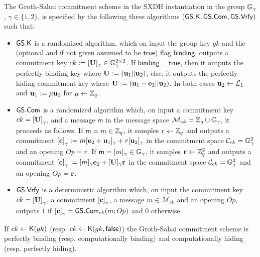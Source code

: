 \begin{definition} The Groth-Sahai commitment scheme in the SXDH instantiation in the group $\mathbb{G}_\gamma$, $\gamma\in\{1,2\}$, is  specified by the following three algorithms 
	$(\mathsf{GS}.\mathsf{K},\mathsf{GS}.\mathsf{Com},\mathsf{GS}.\mathsf{Vrfy})$ such that:
	\begin{itemize} 
		\item  $\mathsf{GS}.\mathsf{K}$ is a randomized algorithm, which on input the group key $gk$ and the (optional and if not given assumed to be $\mathsf{true}$) flag $\mathsf{binding}$, outputs a commitment key $ck:=[\mathbf{{U}}]_\gamma\in\mathbb{G}_\gamma^{2\times 2}$. If $\mathsf{binding}=\mathsf{true}$, then it outputs the {perfectly binding key} where $\mathbf{{U}}:=(\mathbf{u}_1||\mathbf{u}_2)$, else, it outputs the {perfectly hiding commitment key} where $\mathbf{{U}}:=(\mathbf{u}_1-\mathbf{e}_2||\mathbf{u}_2)$. In both cases $\mathbf{u}_2\gets\mathcal{L}_{1}$ and $\mathbf{u}_1:=\mu\mathbf{u}_2$ for $\mu\gets\mathbb{Z}_q$.
		\item $\mathsf{GS}.\mathsf{Com}$ is a randomized algorithm which, on input a commitment key $ck=\left[\mathbf{{U}}\right]_\gamma$, and a message 
		$\mathsf{m}$ in the message space $\mathcal{M}_{ck}=\mathbb{Z}_q\cup\mathbb{G}_\gamma$, it proceeds as follows. If $\mathsf{m}=m\in\mathbb{Z}_q$, it samples $r \gets \mathbb{Z}_q$ and outputs a commitment $\left[\mathbf{c}\right]_\gamma := m[\mathbf{e}_2+\mathbf{u}_1]_\gamma+r[\mathbf{u}_2]_\gamma$ in the commitment space $\mathcal{C}_{ck}=\mathbb{G}_\gamma^2$ and an opening $Op=r$. If $\mathsf{m}=[m]_\gamma\in\mathbb{G}_\gamma$, it samples $\mathbf{r} \gets \mathbb{Z}_q^2$ and outputs a commitment $\left[\mathbf{c}\right]_\gamma := [m]_\gamma\mathbf{e}_2+[\mathbf{{U}}]_\gamma\mathbf{r}$ in the commitment space $\mathcal{C}_{ck}=\mathbb{G}_\gamma^2$ and an opening $Op=\mathbf{r}$.
		\item $\mathsf{GS}.\mathsf{Vrfy}$ is a deterministic algorithm which, on input the commitment key $ck=\left[\mathbf{{U}}\right]_\gamma$, a commitment $\left[\mathbf{c}\right]_\gamma$,  a message 
		$m \in \mathcal{M}_{ck}$ and an opening $Op$, outputs $1$ if $\left[\mathbf{c}\right]_\gamma={\mathsf{GS}}.\mathsf{Com}_{ck}(m;Op)$
		and $0$ otherwise.
	\end{itemize}
\end{definition}

\begin{theorem} If $ck\gets\mathsf{K}(gk)$ (resp. $ck\gets\mathsf{K}(gk,\mathsf{false})$) the Groth-Sahai commitment scheme is perfectly binding (resp. computationally binding) and computationally hiding (resp. perfectly hiding).
\end{theorem}

